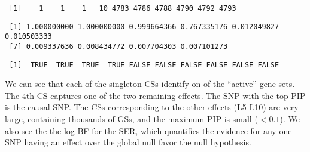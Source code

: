 \documentclass[
  letterpaper,
  DIV=11,
  numbers=noendperiod]{scrreprt}
\newenvironment{Shaded}{\begin{snugshade}}{\end{snugshade}}
\newcommand{\CommentTok}[1]{\textcolor[rgb]{0.37,0.37,0.37}{#1}}
\newcommand{\DecValTok}[1]{\textcolor[rgb]{0.68,0.00,0.00}{#1}}
\newcommand{\FunctionTok}[1]{\textcolor[rgb]{0.28,0.35,0.67}{#1}}
\newcommand{\NormalTok}[1]{\textcolor[rgb]{0.00,0.23,0.31}{#1}}
\newcommand{\SpecialCharTok}[1]{\textcolor[rgb]{0.37,0.37,0.37}{#1}}
\begin{document}
\begin{Shaded}
\end{Shaded}

\begin{verbatim}
 [1]    1    1    1   10 4783 4786 4788 4790 4792 4793
\end{verbatim}

\begin{Shaded}
\end{Shaded}

\begin{verbatim}
 [1] 1.000000000 1.000000000 0.999664366 0.767335176 0.012049827 0.010503333
 [7] 0.009337636 0.008434772 0.007704303 0.007101273
\end{verbatim}

\begin{Shaded}
\end{Shaded}

\begin{verbatim}
 [1]  TRUE  TRUE  TRUE  TRUE FALSE FALSE FALSE FALSE FALSE FALSE
\end{verbatim}

We can see that each of the singleton CSs identify on of the ``active''
gene sets. The 4th CS captures one of the two remaining effects. The SNP
with the top PIP is the causal SNP. The CSs corresponding to the other
effects (L5-L10) are very large, containing thousands of GSs, and the
maximum PIP is small (\(< 0.1\)). We also see the the log BF for the
SER, which quantifies the evidence for any one SNP having an effect over
the global null favor the null hypothesis.
\end{document}
